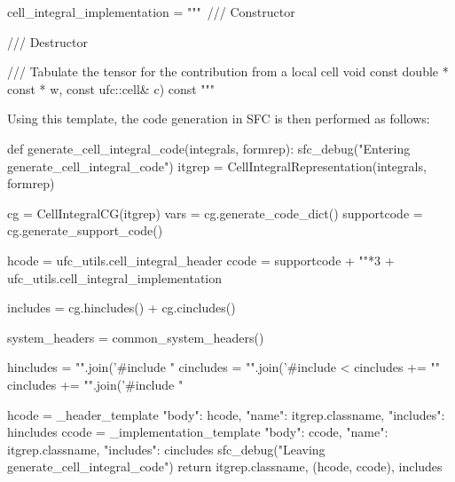 \begin{code}
cell_integral_implementation = """\
/// Constructor
{
}

/// Destructor
{
}

/// Tabulate the tensor for the contribution from a local cell
void %
                                    const double * const * w,
                                    const ufc::cell& c) const
{
}
"""
\end{code}
Using this template, the code generation in SFC is then performed as follows:  
\begin{code}
def generate_cell_integral_code(integrals, formrep):
    sfc_debug("Entering generate_cell_integral_code")
    itgrep = CellIntegralRepresentation(integrals, formrep)
    
    cg = CellIntegralCG(itgrep)
    vars = cg.generate_code_dict()
    supportcode = cg.generate_support_code()

    hcode = ufc_utils.cell_integral_header %
    ccode = supportcode + "\n"*3 + ufc_utils.cell_integral_implementation %
    
    includes = cg.hincludes() + cg.cincludes()

    system_headers = common_system_headers()
    
    hincludes = "\n".join('#include "%
    cincludes =  "\n".join('#include <%
    cincludes += "\n"
    cincludes += "\n".join('#include "%
    
    hcode = _header_template         %
             { "body": hcode, "name": itgrep.classname, "includes": hincludes }
    ccode = _implementation_template %
             { "body": ccode, "name": itgrep.classname, "includes": cincludes }
    sfc_debug("Leaving generate_cell_integral_code")
    return itgrep.classname, (hcode, ccode), includes
\end{code}


